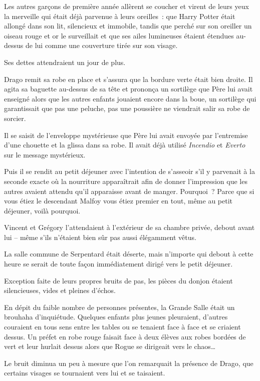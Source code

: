 Les autres garçons de première année allèrent se coucher et virent de leurs yeux la merveille qui était déjà parvenue à leurs oreilles~: que Harry Potter était allongé dans son lit, silencieux et immobile, tandis que perché sur son oreiller un oiseau rouge et or le surveillait et que ses ailes lumineuses étaient étendues au-dessus de lui comme une couverture tirée sur son visage.

Ses dettes attendraient un jour de plus.


Drago remit sa robe en place et s'assura que la bordure verte était bien droite. Il agita sa baguette au-dessus de sa tête et prononça un sortilège que Père lui avait enseigné alors que les autres enfants jouaient encore dans la boue, un sortilège qui garantissait que pas une peluche, pas une poussière ne viendrait salir sa robe de sorcier.

Il se saisit de l'enveloppe mystérieuse que Père lui avait envoyée par l'entremise d'une chouette et la glissa dans sa robe. Il avait déjà utilisé \emph{Incendio} et \emph{Everto} sur le message mystérieux.

Puis il se rendit au petit déjeuner avec l'intention de s'asseoir s'il y parvenait à la seconde exacte où la nourriture apparaîtrait afin de donner l'impression que les autres avaient attendu qu'il apparaisse avant de manger. Pourquoi~? Parce que si vous étiez le descendant Malfoy vous étiez premier en tout, même au petit déjeuner, voilà pourquoi.

Vincent et Grégory l'attendaient à l'extérieur de sa chambre privée, debout avant lui -- même s'ils n'étaient bien sûr pas aussi élégamment vêtus.

La salle commune de Serpentard était déserte, mais n'importe qui debout à cette heure se serait de toute façon immédiatement dirigé vers le petit déjeuner.

Exception faite de leurs propres bruits de pas, les pièces du donjon étaient silencieuses, vides et pleines d'échos.

En dépit du faible nombre de personnes présentes, la Grande Salle était un brouhaha d'inquiétude. Quelques enfants plus jeunes pleuraient, d'autres couraient en tous sens entre les tables ou se tenaient face à face et se criaient dessus. Un préfet en robe rouge faisait face à deux élèves aux robes bordées de vert et leur hurlait dessus alors que Rogue se dirigeait vers le chaos…

Le bruit diminua un peu à mesure que l'on remarquait la présence de Drago, que certains visages se tournaient vers lui et se taisaient.

